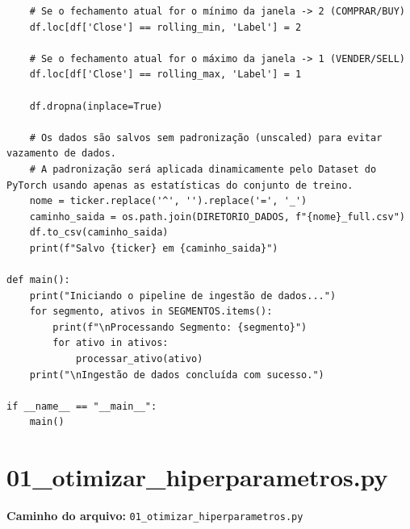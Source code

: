 \documentclass{article}
\begin{document}
\begin{verbatim}
    # Se o fechamento atual for o mínimo da janela -> 2 (COMPRAR/BUY)
    df.loc[df['Close'] == rolling_min, 'Label'] = 2
    
    # Se o fechamento atual for o máximo da janela -> 1 (VENDER/SELL)
    df.loc[df['Close'] == rolling_max, 'Label'] = 1
    
    df.dropna(inplace=True)
    
    # Os dados são salvos sem padronização (unscaled) para evitar vazamento de dados. 
    # A padronização será aplicada dinamicamente pelo Dataset do PyTorch usando apenas as estatísticas do conjunto de treino.
    nome = ticker.replace('^', '').replace('=', '_')
    caminho_saida = os.path.join(DIRETORIO_DADOS, f"{nome}_full.csv")
    df.to_csv(caminho_saida)
    print(f"Salvo {ticker} em {caminho_saida}")

def main():
    print("Iniciando o pipeline de ingestão de dados...")
    for segmento, ativos in SEGMENTOS.items():
        print(f"\nProcessando Segmento: {segmento}")
        for ativo in ativos:
            processar_ativo(ativo)
    print("\nIngestão de dados concluída com sucesso.")

if __name__ == "__main__":
    main()
\end{verbatim}

\newpage

\section{01\_otimizar\_hiperparametros.py}
\textbf{Caminho do arquivo:} \texttt{01\_otimizar\_hiperparametros.py}
\end{document}

